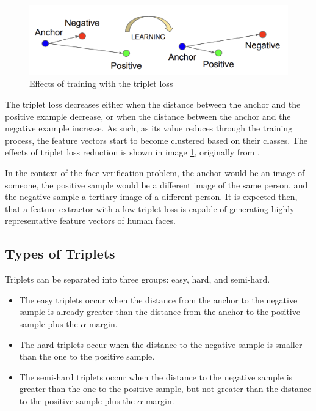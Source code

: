 \documentclass[runningheads]{llncs}
\begin{document}
\begin{figure}
    \begin{center}
        \includegraphics[scale=0.25]{triplet_graph.png}
        \caption{Effects of training with the triplet loss}
        \label{triplet_graph}
    \end{center}
\end{figure}

The triplet loss decreases either when the distance between the anchor and the positive example decrease, or when the distance between the anchor and the negative example increase. As such, as its value reduces through the training process, the feature vectors start to become clustered based on their classes. The effects of triplet loss reduction is shown in image \ref{triplet_graph}, originally from \cite{schroff2015facenet}.

In the context of the face verification problem, the anchor would be an image of someone, the positive sample would be a different image of the same person, and the negative sample a tertiary image of a different person. It is expected then, that a feature extractor with a low triplet loss is capable of generating highly representative feature vectors of human faces.

\subsection{Types of Triplets}

Triplets can be separated into three groups: easy, hard, and semi-hard.

\begin{itemize}
    \item The easy triplets occur when the distance from the anchor to the negative sample is already greater than the distance from the anchor to the positive sample plus the $\alpha$ margin.
    
    \item The hard triplets occur when the distance to the negative sample is smaller than the one to the positive sample.
    
    \item The semi-hard triplets occur when the distance to the negative sample is greater than the one to the positive sample, but not greater than the distance to the positive sample plus the $\alpha$ margin. 
\end{itemize}
\end{document}
